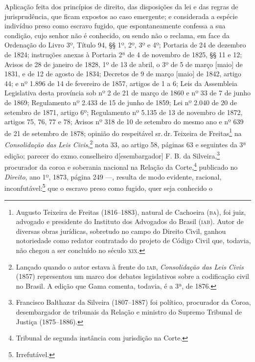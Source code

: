 {Aplicação feita dos princípios de direito, das disposições da lei e das
regras de jurisprudência, que ficam expostos ao caso emergente; e
considerada a espécie indivíduo preso como escravo fugido, que
espontaneamente confessa a sua condição, cujo senhor não é conhecido, ou
sendo não o reclama, em face da Ordenação do Livro 3º, Título 94, §§ 1º,
2º, 3º e 4º; Portaria de 24 de dezembro de 1824; instruções anexas à
Portaria 2ª de 4 de novembro de 1825, §§ 11 e 12; Avisos de 28 de
janeiro de 1828, 1º de 13 de abril, o 3º de 5 de março {[}maio{]} de
1831, e de 12 de agosto de 1834; Decretos de 9 de março {[}maio{]} de
1842, artigo 44; e nº 1.896 de 14 de fevereiro de 1857, artigos de
1 a 6; Leis da Assembleia Legislativa desta província sob nº 2 de 21 de
março de 1860 e nº 33 de 7 de junho de 1869; Regulamento nº 2.433 de 15
de junho de 1859; Lei nº 2.040 de 20 de setembro de 1871, artigo 6º;
Regulamento nº 5.135 de 13 de novembro de 1872, artigos 75, 76, 77 e 78;
Avisos nº 318 de 10 de setembro do mesmo ano e nº 639 de 21 de setembro
de 1878; opinião do respeitável sr.\,dr.\,Teixeira de Freitas\footnote{
  Augusto Teixeira de Freitas (1816--1883), natural de Cachoeira (\textsc{ba}),
  foi juiz, advogado e presidente do Instituto dos Advogados do Brasil
  (\textsc{iab}). Autor de diversas obras jurídicas, sobretudo no campo do
  Direito Civil, ganhou notoriedade como redator contratado do projeto
  de Código Civil que, todavia, não chegou a ser concluído no século \textsc{xix}.}
na \emph{Consolidação das Leis Civis},\footnote{Lançado quando o autor
  estava à frente do \textsc{iab},
  \emph{Consolidação das Leis Civis} (1857) representou um marco dos
  debates legislativos sobre a codificação civil no Brasil. A edição que
  Gama comenta, todavia, é a 3ª, de 1876.} nota 33, ao artigo
58, páginas 63 e seguintes da 3ª edição; parecer do exmo.\,conselheiro
d{[}esembargador{]} F. B. da Silveira,\footnote{Francisco Balthazar \label{balthazar}
  da Silveira (1807--1887) foi político, procurador da Coroa,
  desembargador de tribunais da Relação e ministro do Supremo Tribunal de Justiça (1875--1886).} procurador da coroa e soberania nacional na
Relação da Corte,\footnote{Tribunal de segunda instância com jurisdição
  na Corte.} publicado no \emph{Direito}, ano 1º, 1873, página 249
---, resulta de modo evidente, racional, inconfutável:\footnote{
  Irrefutável.} que o escravo preso como fugido, quer seja conhecido o
}
